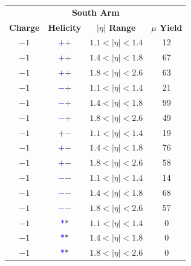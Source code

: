 \begin{figure}
  \begin{minipage}[c]{0.67\textwidth}
    \centering
    \begin{tabular}{cccc}
      \toprule
      \multicolumn{4}{c}{\textbf{South Arm}} \\ 
      \textbf{Charge} & 
      \textbf{Helicity} & 
      \textbf{$\vert\eta\vert$ Range} &
      \textbf{$\mu$ Yield} \\ 
      \midrule
      $-1$ &\textbf{\textcolor{blue}{$+$}\textcolor{ucrgold}{$+$}} & $1.1 <\vert\eta\vert< 1.4$ & 12 \\
      $-1$ &\textbf{\textcolor{blue}{$+$}\textcolor{ucrgold}{$+$}} & $1.4 <\vert\eta\vert< 1.8$ & 67 \\
      $-1$ &\textbf{\textcolor{blue}{$+$}\textcolor{ucrgold}{$+$}} & $1.8 <\vert\eta\vert< 2.6$ & 63 \\
      $-1$ &\textbf{\textcolor{blue}{$-$}\textcolor{ucrgold}{$+$}} & $1.1 <\vert\eta\vert< 1.4$ & 21 \\
      $-1$ &\textbf{\textcolor{blue}{$-$}\textcolor{ucrgold}{$+$}} & $1.4 <\vert\eta\vert< 1.8$ & 99 \\
      $-1$ &\textbf{\textcolor{blue}{$-$}\textcolor{ucrgold}{$+$}} & $1.8 <\vert\eta\vert< 2.6$ & 49 \\
      $-1$ &\textbf{\textcolor{blue}{$+$}\textcolor{ucrgold}{$-$}} & $1.1 <\vert\eta\vert< 1.4$ & 19 \\
      $-1$ &\textbf{\textcolor{blue}{$+$}\textcolor{ucrgold}{$-$}} & $1.4 <\vert\eta\vert< 1.8$ & 76 \\
      $-1$ &\textbf{\textcolor{blue}{$+$}\textcolor{ucrgold}{$-$}} & $1.8 <\vert\eta\vert< 2.6$ & 58 \\
      $-1$ &\textbf{\textcolor{blue}{$-$}\textcolor{ucrgold}{$-$}} & $1.1 <\vert\eta\vert< 1.4$ & 14 \\
      $-1$ &\textbf{\textcolor{blue}{$-$}\textcolor{ucrgold}{$-$}} & $1.4 <\vert\eta\vert< 1.8$ & 68 \\
      $-1$ &\textbf{\textcolor{blue}{$-$}\textcolor{ucrgold}{$-$}} & $1.8 <\vert\eta\vert< 2.6$ & 57 \\
      $-1$ &\textbf{\textcolor{blue}{$*$}\textcolor{ucrgold}{$*$}} & $1.1 <\vert\eta\vert< 1.4$ & 0 \\
      $-1$ &\textbf{\textcolor{blue}{$*$}\textcolor{ucrgold}{$*$}} & $1.4 <\vert\eta\vert< 1.8$ & 0 \\
      $-1$ &\textbf{\textcolor{blue}{$*$}\textcolor{ucrgold}{$*$}} & $1.8 <\vert\eta\vert< 2.6$ & 0 \\

\end{tabular}
\end{minipage}
\end{figure}
